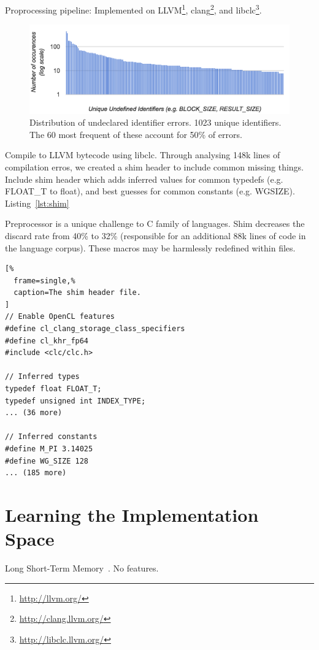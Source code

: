 \documentclass[preprint,nonatbib,10pt,nocopyrightspace]{sigplanconf}
\begin{document}
Proprocessing pipeline: Implemented on
LLVM\footnote{\url{http://llvm.org/}},
clang\footnote{\url{http://clang.llvm.org/}}, and
libclc\footnote{\url{http://libclc.llvm.org/}}.

\begin{figure}[t]
\includegraphics[width=\columnwidth]{img/undeclared-identifiers.png}
\caption{%
  Distribution of undeclared identifier errors. 1023 unique
  identifiers. The 60 most frequent of these account for 50\% of
  errors.%
}
\end{figure}

Compile to LLVM bytecode using libclc. Through analysing 148k lines of
compilation erros, we created a shim header to include common missing
things. Include shim header which adds inferred values for common
typedefs (e.g. FLOAT\_T to float), and best guesses for common
constants (e.g. WGSIZE). Listing~\ref{lst:shim}

Preprocessor is a unique challenge to C family of languages. Shim
decreases the discard rate from 40\% to 32\% (responsible for an
additional 88k lines of code in the language corpus). These macros may
be harmlessly redefined within files.

\lstset{language=[OpenCL]C}
\begin{lstlisting}[%
  frame=single,%
  caption=The shim header file.
]
// Enable OpenCL features
#define cl_clang_storage_class_specifiers
#define cl_khr_fp64
#include <clc/clc.h>

// Inferred types
typedef float FLOAT_T;
typedef unsigned int INDEX_TYPE;
... (36 more)

// Inferred constants
#define M_PI 3.14025
#define WG_SIZE 128
... (185 more)
\end{lstlisting}


\section{Learning the Implementation Space}\label{sec:ml}

Long Short-Term Memory~\cite{Hochreiter1997}. No features.
\end{document}
